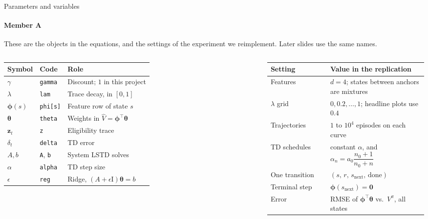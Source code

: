 \documentclass[aspectratio=169,11pt]{beamer}
\newcommand{\memberA}{Member A}
\newcommand{\speaker}[1]{\framesubtitle{#1}}
\newcommand{\vphi}{\bm{\phi}}
\newcommand{\vz}{\mathbf{z}}
\newcommand{\vth}{\bm{\theta}}
\begin{document}
\begin{frame}{Parameters and variables}
  \speaker{\memberA}
  \small
  These are the objects in the equations, and the settings of the experiment we reimplement. Later slides use the same names.
  \vspace{0.45em}
  \begin{columns}[T]
    \scriptsize
    \renewcommand{\arraystretch}{1.08}%
    \begin{tabular}{@{}lll@{}}
      \toprule
      \textbf{Symbol} & \textbf{Code} & \textbf{Role} \\
      \midrule
      $\gamma$ & \texttt{gamma} & Discount; $1$ in this project \\
      $\lambda$ & \texttt{lam} & Trace decay, in $[0,1]$ \\
      $\vphi(s)$ & \texttt{phi[s]} & Feature row of state $s$ \\
      $\vth$ & \texttt{theta} & Weights in $\hat V=\vphi^\top\vth$ \\
      $\vz_t$ & \texttt{z} & Eligibility trace \\
      $\delta_t$ & \texttt{delta} & TD error \\
      $A,b$ & \texttt{A}, \texttt{b} & System LSTD solves \\
      $\alpha$ & \texttt{alpha} & TD step size \\
      $\epsilon$ & \texttt{reg} & Ridge, $(A+\epsilon \mathrm{I})\vth=b$ \\
      \bottomrule
    \end{tabular}
    \scriptsize
    \renewcommand{\arraystretch}{1.08}%
    \begin{tabular}{@{}lp{0.62\linewidth}@{}}
      \toprule
      \textbf{Setting} & \textbf{Value in the replication} \\
      \midrule
      Features & $d=4$; states between anchors are mixtures \\
      $\lambda$ grid & $0,0.2,\ldots,1$; headline plots use $0.4$ \\
      Trajectories & $1$ to $10^4$ episodes on each curve \\
      TD schedules & constant $\alpha$, and $\alpha_n=a_0\dfrac{n_0+1}{n_0+n}$ \\
      One transition & $(s,\, r,\, s_{\mathrm{next}},\, \mathrm{done})$ \\
      Terminal step & $\vphi(s_{\mathrm{next}})=\mathbf{0}$ \\
      Error & RMSE of $\vphi^\top\vth$ vs.\ $V^\pi$, all states \\
      \bottomrule
    \end{tabular}
  \end{columns}
\end{frame}
\end{document}
